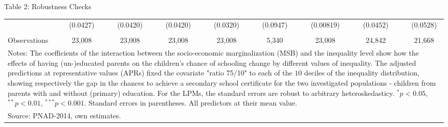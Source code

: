 \documentclass{beamer}
\begin{document}
\begin{frame}{Table 2: Robustness Checks}
\begin{table}[htbp]
\begin{adjustbox}{max width=\textwidth}
\begin{tabular}{llllllllllllllll}
          & \multicolumn{1}{c}{(0.0427)} &       & \multicolumn{1}{c}{(0.0420)} &       & \multicolumn{1}{c}{(0.0420)} &       & \multicolumn{1}{c}{(0.0320)} &       & \multicolumn{1}{c}{(0.0947)} &       & \multicolumn{1}{c}{(0.00819)} &       & \multicolumn{1}{c}{(0.0452)} &       & \multicolumn{1}{c}{(0.0528)} \\
          & \multicolumn{1}{c}{} &       & \multicolumn{1}{c}{} &       & \multicolumn{1}{c}{} &       & \multicolumn{1}{c}{} &       &       &       &       &       &       &       &  \\
    Observations & \multicolumn{1}{c}{23,008} &       & \multicolumn{1}{c}{23,008} &       & \multicolumn{1}{c}{23,008} &       & \multicolumn{1}{c}{23,008} &       & \multicolumn{1}{c}{5,340} &       & \multicolumn{1}{c}{23,008} &       & \multicolumn{1}{c}{24,842} &       & \multicolumn{1}{c}{21,668} \\
     \midrule
    \multicolumn{16}{p{91.685em}}{Notes: The coefficients of the interaction between the socio-economic marginalization (MSB) and the inequality level show how the effects of having (un-)educated parents on the children's chance of schooling change by different values of inequality. The adjusted predictions at representative values (APRs) fixed the covariate "ratio 75/10" to each of the $10$ deciles of the inequality distribution, showing respectively the gap in the chances to achieve a secondary school certificate for the two investigated populations - children from parents with and without (primary) education. For the LPMs, the standard errors are robust to arbitrary heteroskedasticy. $^{*}p<0.05$, $^{**}p<0.01$, $^{***}p<0.001$. Standard errors in parentheses. All predictors at their mean value.} \\
    \multicolumn{16}{l}{Source: PNAD-2014, own estimates.} \\
    \end{tabular}%
  \label{tab:Rob.Checks}%
   \end{adjustbox}
\end{table}%

\vspace{-0.5cm}	
\flushright \hyperlink{main6}{\beamerbutton{\textcolor{red}{Back to Presentation}}}		
\end{frame}
\end{document}
